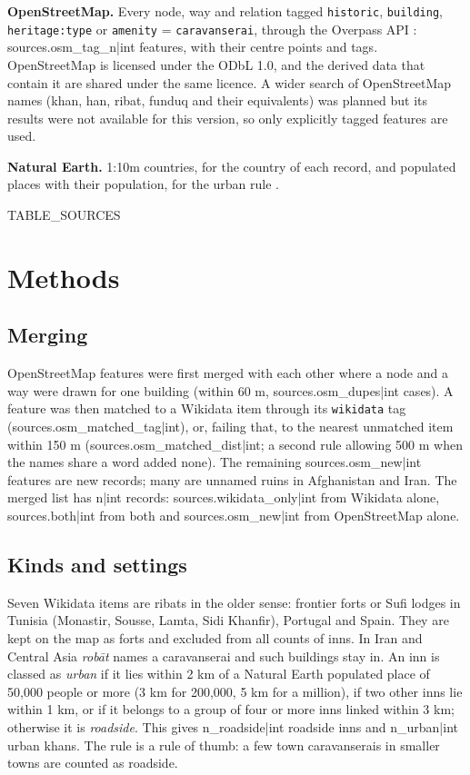 \documentclass[11pt,a4paper]{article}
\begin{document}
\textbf{OpenStreetMap.} Every node, way and relation tagged \texttt{historic}, \texttt{building}, \texttt{heritage:type} or \texttt{amenity} = \texttt{caravanserai}, through the Overpass API \citep{osm}: {{sources.osm_tag_n|int}} features, with their centre points and tags. OpenStreetMap is licensed under the ODbL 1.0, and the derived data that contain it are shared under the same licence. A wider search of OpenStreetMap names (khan, han, ribat, funduq and their equivalents) was planned but its results were not available for this version, so only explicitly tagged features are used.

\textbf{Natural Earth.} 1:10m countries, for the country of each record, and populated places with their population, for the urban rule \citep{naturalearth}.

{{TABLE_SOURCES}}

\section{Methods}
\subsection{Merging}
OpenStreetMap features were first merged with each other where a node and a way were drawn for one building (within 60 m, {{sources.osm_dupes|int}} cases). A feature was then matched to a Wikidata item through its \texttt{wikidata} tag ({{sources.osm_matched_tag|int}}), or, failing that, to the nearest unmatched item within 150 m ({{sources.osm_matched_dist|int}}; a second rule allowing 500 m when the names share a word added none). The remaining {{sources.osm_new|int}} features are new records; many are unnamed ruins in Afghanistan and Iran. The merged list has {{n|int}} records: {{sources.wikidata_only|int}} from Wikidata alone, {{sources.both|int}} from both and {{sources.osm_new|int}} from OpenStreetMap alone.

\subsection{Kinds and settings}
Seven Wikidata items are ribats in the older sense: frontier forts or Sufi lodges in Tunisia (Monastir, Sousse, Lamta, Sidi Khanfir), Portugal and Spain. They are kept on the map as forts and excluded from all counts of inns. In Iran and Central Asia \emph{rob\=at} names a caravanserai and such buildings stay in. An inn is classed as \emph{urban} if it lies within 2 km of a Natural Earth populated place of 50,000 people or more (3 km for 200,000, 5 km for a million), if two other inns lie within 1 km, or if it belongs to a group of four or more inns linked within 3 km; otherwise it is \emph{roadside}. This gives {{n_roadside|int}} roadside inns and {{n_urban|int}} urban khans. The rule is a rule of thumb: a few town caravanserais in smaller towns are counted as roadside.
\end{document}
